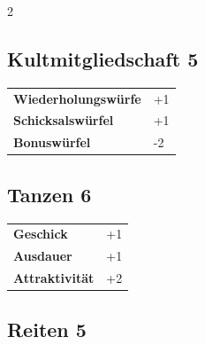 \begin{multicols}{2}
\begin{tcolorbox}

\end{tcolorbox}

\begin{tcolorbox}
    \subsection*{Kultmitgliedschaft \hfill \small{5 }}
    \tcblower




\begin{tabular}{@{}ll@{}}
    \textbf{Wiederholungswürfe} & +1\\
    \textbf{Schicksalswürfel} & +1\\
    \textbf{Bonuswürfel} & -2\\
\end{tabular}


\end{tcolorbox}

\begin{tcolorbox}
    \subsection*{Tanzen \hfill \small{6 }}
    \tcblower




\begin{tabular}{@{}ll@{}}
    \textbf{Geschick} & +1\\
    \textbf{Ausdauer} & +1\\
    \textbf{Attraktivität} & +2\\
\end{tabular}


\end{tcolorbox}

\begin{tcolorbox}
    \subsection*{Reiten \hfill \small{5 }}
    \tcblower





\end{tcolorbox}
\end{multicols}
